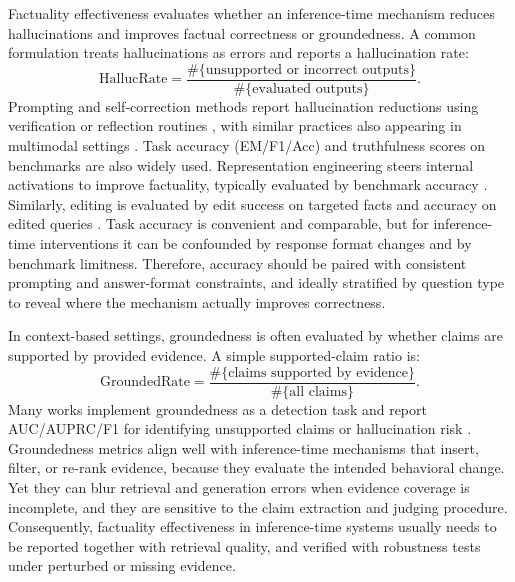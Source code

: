Factuality effectiveness evaluates whether an inference-time mechanism reduces hallucinations and improves factual correctness or groundedness. A common formulation treats hallucinations as errors and reports a hallucination rate:
\[
\mathrm{HallucRate}
=
\frac{\#\{\text{unsupported or incorrect outputs}\}}
{\#\{\text{evaluated outputs}\}}.
\]
Prompting and self-correction methods report hallucination reductions using verification or reflection routines \citep{dhuliawala2024chain, li2024think, feng2024teaching}, with similar practices also appearing in multimodal settings \citep{Park2024ConVisCD, Yuan2024HELPDMH, Suo2025OctopusAH}. Task accuracy (EM/F1/Acc) and truthfulness scores on benchmarks are also widely used. Representation engineering steers internal activations to improve factuality, typically evaluated by benchmark accuracy \citep{li2023iti, bayat2024enhanced, wang2024act, liu2024uth, li2025truthneurons}. 
Similarly, editing is evaluated by edit success on targeted facts and accuracy on edited queries \citep{meng2022locating, meng2022memit, hartvigsen2024aging, wang2024wise}. Task accuracy is convenient and comparable, but for inference-time interventions it can be confounded by response format changes and by benchmark limitness. Therefore, accuracy should be paired with consistent prompting and answer-format constraints, and ideally stratified by question type to reveal where the mechanism actually improves correctness.


In context-based settings, groundedness is often evaluated by whether claims are supported by provided evidence. A simple supported-claim ratio is:
\[
\mathrm{GroundedRate}
=
\frac{\#\{\text{claims supported by evidence}\}}
{\#\{\text{all claims}\}}.
\]
Many works implement groundedness as a detection task and report AUC/AUPRC/F1 for identifying unsupported claims or hallucination risk \citep{asai2024self, zhou2024metacognitive}. Groundedness metrics align well with inference-time mechanisms that insert, filter, or re-rank evidence, because they evaluate the intended behavioral change. Yet they can blur retrieval and generation errors when evidence coverage is incomplete, and they are sensitive to the claim extraction and judging procedure. Consequently, factuality effectiveness in inference-time systems usually needs to be reported together with retrieval quality, and verified with robustness tests under perturbed or missing evidence.


